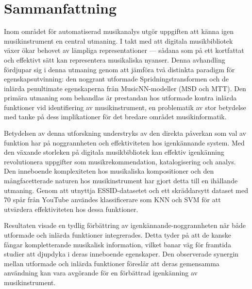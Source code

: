 \chapter*{Sammanfattning}

Inom omr\aa{}det f\"{o}r automatiserad musikanalys utg\"{o}r uppgiften att k\"{a}nna igen musikinstrument en central utmaning. I takt med att digitala musikbibliotek v\"{a}xer \"{o}kar behovet av l\"{a}mpliga representationer --- s\aa{}dana som p\aa{} ett kortfattat och effektivt s\"{a}tt kan representera musikaliska nyanser. Denna avhandling f\"{o}rdjupar sig i denna utmaning genom att j\"{a}mf\"{o}ra tv\aa{} distinkta paradigm f\"{o}r egenskapsutvinning: den noggrant utformade Spridningstransformen och de inl\"{a}rda penultimate egenskaperna fr\aa{}n MusicNN-modeller (MSD och MTT). Den prim\"{a}ra utmaning som behandlas \"{a}r prestandan hos utformade kontra inl\"{a}rda funktioner vid identifiering av musikinstrument, en problematik av stor betydelse med tanke p\aa{} dess implikationer f\"{o}r det bredare omr\aa{}det musikinformatik.

Betydelsen av denna utforskning understryks av den direkta p\aa{}verkan som val av funktion har p\aa{} noggrannheten och effektiviteten hos igenk\"{a}nnande system. Med den v\"{a}xande storleken p\aa{} digitala musikbibliotek kan effektiv igenk\"{a}nning revolutionera uppgifter som musikrekommendation, katalogisering och analys. Den inneboende komplexiteten hos musikaliska kompositioner och den m\aa{}ngfacetterade naturen hos musikinstrument har gjort detta till en ih\aa{}llande utmaning. Genom att utnyttja ESSID-datasetet och ett skr\"{a}ddarsytt dataset med 70 sp\aa{}r fr\aa{}n YouTube anv\"{a}ndes klassificerare som KNN och SVM f\"{o}r att utv\"{a}rdera effektiviteten hos dessa funktioner.

Resultaten visade en tydlig f\"{o}rb\"{a}ttring av igenk\"{a}nnande-noggrannheten n\"{a}r b\aa{}de utformade och inl\"{a}rda funktioner integrerades. Detta tyder p\aa{} att de kanske f\aa{}ngar kompletterande musikalisk information, vilket banar v\"{a}g f\"{o}r framtida studier att djupdyka i deras inneboende egenskaper. Den observerade synergin mellan utformade och inl\"{a}rda funktioner f\"{o}resl\aa{}r att deras gemensamma anv\"{a}ndning kan vara avg\"{o}rande f\"{o}r en f\"{o}rb\"{a}ttrad igenk\"{a}nning av musikinstrument.

\clearpage
